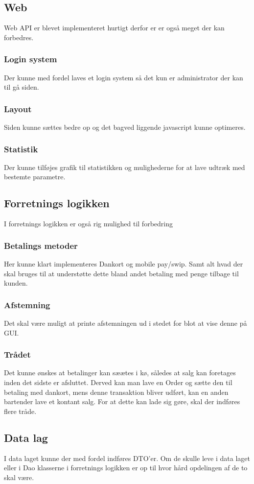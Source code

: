 \subsection{Web}
Web \gls{API} er blevet implementeret hurtigt derfor er er også meget der kan forbedres.

\subsubsection{Login system}
Der kunne med fordel laves et login system så det kun er administrator der kan til gå siden.

\subsubsection{Layout}
Siden kunne sættes bedre op og det bagved liggende javascript kunne optimeres.

\subsubsection{Statistik}
Der kunne tilføjes grafik til statistikken og mulighederne for at lave udtræk med bestemte parametre.

\subsection{Forretnings logikken}
I forretnings logikken er også rig mulighed til forbedring

\subsubsection{Betalings metoder}
Her kunne klart implementeres Dankort og mobile pay/swip. 
Samt alt hvad der skal bruges til at understøtte dette bland andet betaling med penge tilbage til kunden.

\subsubsection{Afstemning}
Det skal være muligt at printe afstemningen ud i stedet for blot at vise denne på \gls{GUI}.

\subsubsection{Trådet}
Det kunne ønskes at betalinger kan sæætes i kø, således at salg kan foretages inden det sidste er afsluttet. Derved kan man lave en Order og sætte den til betaling med dankort, mens denne transaktion bliver udført, kan en anden bartender lave et kontant salg. For at dette kan lade sig gøre, skal der indføres flere tråde.

\subsection{Data lag}
I data laget kunne der med fordel indføres \gls{DTO}'er. Om de skulle leve i data laget eller i \gls{Dao} klasserne i forretnings logikken er op til hvor hård opdelingen af de to skal være.